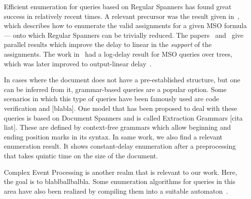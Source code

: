 Efficient enumeration for queries based on Regular Spanners has found great success in relatively recent times. A relevant precursor was the result given in~\cite{bagan2006mso}, which describes how to enumerate the valid assignments for a given MSO formula --- onto which Regular Spanners can be trivially reduced. The papers~\cite{FlorenzanoRUVV20} and~\cite{amarilli2019constant} give parallel results which improve the delay to linear in the {\it support} of the assignments. The work in~\cite{Niewerth18} had a log-delay result for MSO queries over trees, which was later improved to output-linear delay~\cite{amarilli2019enumeration}. 

In cases where the document does not have a pre-established structure, but one can be inferred from it, grammar-based queries are a popular option. Some scenarios in which this type of queries have been famously used are code verification and [blabla]. One model that has been proposed to deal with these queries is based on Document Spanners and is called Extraction Grammars [cita liat]. These are defined by context-free grammars which allow beginning and ending position marks in its syntax. 
In same work, we also find a relevant enumeration result. It shows constant-delay enumeration after a preprocessing that takes quintic time on the size of the document.

Complex Event Processing is another realm that is relevant to our work. Here, the goal is to blablballbalbla. Some enumeration algorithms for queries in this area have also been realized by compiling them into a suitable automaton~\cite{GrezRU19,GrezR20,BucchiGQRV22}.



